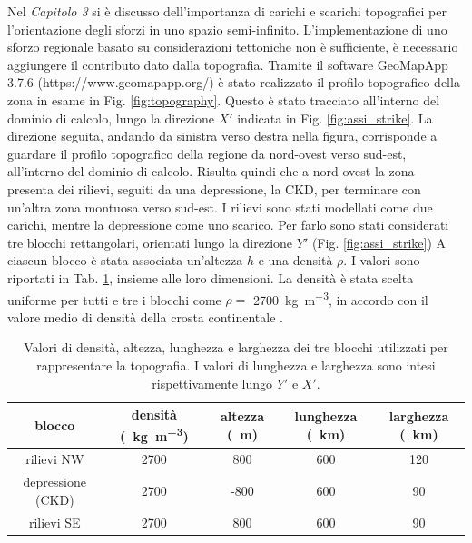 Nel \textit{Capitolo 3} si è discusso dell'importanza di carichi e scarichi topografici per l'orientazione degli sforzi in uno spazio semi-infinito.
L'implementazione di uno sforzo regionale basato su considerazioni tettoniche non è sufficiente, è necessario aggiungere il contributo dato dalla topografia.
Tramite il software GeoMapApp 3.7.6 (https://www.geomapapp.org/) è stato realizzato il profilo topografico della zona in esame in Fig. \ref{fig:topography}. Questo è stato tracciato all'interno del dominio di calcolo, lungo la direzione \(X'\) indicata in Fig. \ref{fig:assi_strike}. La direzione seguita, andando da sinistra verso destra nella figura, corrisponde a guardare il profilo topografico della regione da nord-ovest verso sud-est, all'interno del dominio di calcolo.
Risulta quindi che a nord-ovest la zona presenta dei rilievi, seguiti da una depressione, la CKD, per terminare con un'altra zona montuosa verso sud-est.
I rilievi sono stati modellati come due carichi, mentre la depressione come uno scarico.
Per farlo sono stati considerati tre blocchi rettangolari, orientati lungo la direzione \(Y'\) (Fig. \ref{fig:assi_strike}) 
A ciascun blocco è stata associata un'altezza \(h\) e una densità \(\rho\).
I valori sono riportati in Tab. \ref{tab:parametri_blocchi}, insieme alle loro dimensioni.
La densità è stata scelta uniforme per tutti e tre i blocchi come \(\rho=\) \qty{2700}{\kilogram\per\meter\cubed}, in accordo con il valore medio di densità della crosta continentale \citep{plate_tectonics_book}.

\begin{table}[H]
    \centering
    \begin{tabular}{ccccc}
        \toprule
        blocco & densità (\qty{}{\kilogram\per\meter\cubed}) & altezza (\qty{}{\meter}) & lunghezza (\qty{}{\kilo\meter}) & larghezza (\qty{}{\kilo\meter}) \\
        \midrule
        rilievi NW & 2700 & 800 & 600 & 120 \\
        depressione (CKD) & 2700 & -800 & 600 & 90 \\
        rilievi SE & 2700 & 800 & 600 & 90 \\ 
        \bottomrule
    \end{tabular}
    \caption{Valori di densità, altezza, lunghezza e larghezza dei tre blocchi utilizzati per rappresentare la topografia. I valori di lunghezza e larghezza sono intesi rispettivamente lungo \(Y'\) e \(X'\).}
    \label{tab:parametri_blocchi}
\end{table}

